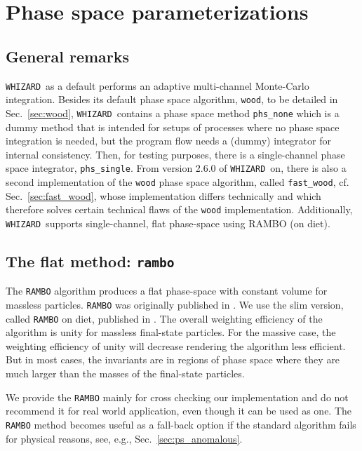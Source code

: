 \documentclass[12pt]{book}
\newcommand{\ttt}[1]{\texttt{#1}}
\newcommand{\whizard}{\ttt{WHIZARD}}
\begin{document}
\chapter{Phase space parameterizations}

\section{General remarks}

\whizard\ as a default performs an adaptive multi-channel Monte-Carlo
integration. Besides its default phase space algorithm, \ttt{wood}, to
be detailed in Sec.~\ref{sec:wood}, \whizard\ contains a phase space
method \ttt{phs\_none} which is a dummy method that is intended for
setups of processes where no phase space integration is needed, but
the program flow needs a (dummy) integrator for internal
consistency. Then, for testing purposes, there is a single-channel
phase space integrator, \ttt{phs\_single}. From version 2.6.0 of
\whizard\ on, there is also a second implementation of the \ttt{wood}
phase space algorithm, called \ttt{fast\_wood},
cf. Sec.~\ref{sec:fast_wood}, whose implementation differs technically
and which therefore solves certain technical flaws of the \ttt{wood}
implementation.
Additionally, \whizard\ supports single-channel, flat phase-space using RAMBO
(on diet).


\section{The flat method: \ttt{rambo}}
\label{sec:rambo}

The \ttt{RAMBO} algorithm produces a flat phase-space with constant volume for
massless particles. \ttt{RAMBO} was originally published in
\cite{Kleiss:1985gy}. We use the slim version, called \ttt{RAMBO} on diet,
published in \cite{Platzer:2013esa}.
The overall weighting efficiency of the algorithm is unity for massless
final-state particles. For the massive case, the weighting efficiency of unity will
decrease rendering the algorithm less efficient. But in most cases, the
invariants are in regions of phase space where they are much larger than the
masses of the final-state particles.

We provide the \ttt{RAMBO} mainly for cross checking our
implementation and do not recommend it for real world application,
even though it can be used as one.  The \ttt{RAMBO} method becomes
useful as a fall-back option if the standard algorithm fails for
physical reasons, see, e.g., Sec.~\ref{sec:ps_anomalous}.
\end{document}
